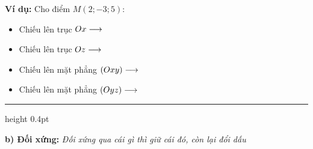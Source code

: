 \documentclass[12pt, a4paper]{article}
\begin{document}
\par\vspace{0.15cm}
\noindent\textbf{\textcolor{deepblue}{Ví dụ:}} Cho điểm $M(2; -3; 5)$:
\begin{itemize}\setlength{\topsep}{1pt}\setlength{\itemsep}{2pt}\setlength{\parskip}{0pt}
    \item Chiếu lên trục $Ox \longrightarrow \dotfill$
    \item Chiếu lên trục $Oz \longrightarrow \dotfill$
    \item Chiếu lên mặt phẳng $(Oxy) \longrightarrow \dotfill$
    \item Chiếu lên mặt phẳng $(Oyz) \longrightarrow \dotfill$
\end{itemize}

\par\vspace{0.2cm}
\hrule height 0.4pt \relax
\par\vspace{0.15cm}

\noindent\textbf{\textcolor{deepblue}{\large b) Đối xứng:}} \textit{\textcolor{accentred}{Đối xứng qua cái gì thì giữ cái đó, còn lại đổi dấu}}
\par\vspace{0.06cm}
\end{document}
